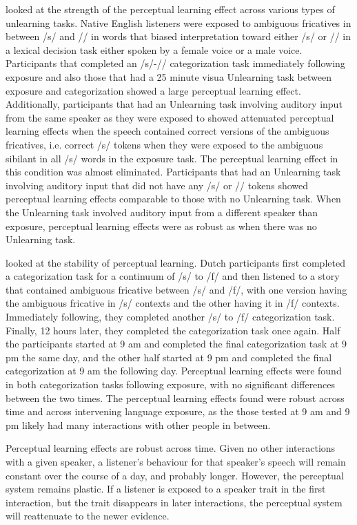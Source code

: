 \documentclass[11pt]{article} %
\begin{document}
\citet{Kraljic2005} looked at the strength of the perceptual learning effect across various types of unlearning tasks. 
 Native English listeners were exposed to ambiguous fricatives in between /s/ and /\textesh/ in words that biased interpretation toward either /s/ or /\textesh/ in a lexical decision task either spoken by a female voice or a male voice.
 Participants that completed an /s/-/\textesh/ categorization task immediately following exposure and also those that had a 25 minute visua Unlearning task between exposure and categorization showed a large perceptual learning effect.  
Additionally, participants that had an Unlearning task involving auditory input from the same speaker as they were exposed to showed attenuated perceptual learning effects when the speech contained correct versions of the ambiguous fricatives, i.e. correct /s/ tokens when they were exposed to the ambiguous sibilant in all /s/ words in the exposure task.  
The perceptual learning effect in this condition was almost eliminated. 
 Participants that had an Unlearning task involving auditory input that did not have any /s/ or /\textesh/ tokens showed perceptual learning effects comparable to those with no Unlearning task.  
When the Unlearning task involved auditory input from a different speaker than exposure, perceptual learning effects were as robust as when there was no Unlearning task.

\citet{Eisner2006} looked at the stability of perceptual learning. 
Dutch participants first completed a categorization task for a continuum of /s/ to /f/ and then listened to a story that contained ambiguous fricative between /s/ and /f/, with one version having the ambiguous fricative in /s/ contexts and the other having it in /f/ contexts.
Immediately following, they completed another /s/ to /f/ categorization task.  
Finally, 12 hours later, they completed the categorization task once again.
Half the participants started at 9 am and completed the final categorization task at 9 pm the same day, and the other half started at 9 pm and completed the final categorization at 9 am the following day.
Perceptual learning effects were found in both categorization tasks following exposure, with no significant differences between the two times. 
 The perceptual learning effects found were robust across time and across intervening language exposure, as the those tested at 9 am and 9 pm likely had many interactions with other people in between.

Perceptual learning effects are robust across time.  
Given no other interactions with a given speaker, a listener's behaviour for that speaker's speech will remain constant over the course of a day, and probably longer. 
However, the perceptual system remains plastic.  
If a listener is exposed to a speaker trait in the first interaction, but the trait disappears in later interactions, the perceptual system will reattenuate to the newer evidence.
\end{document}
